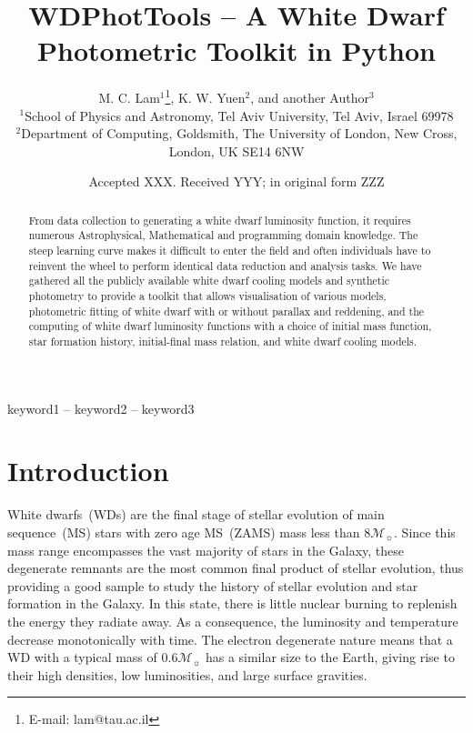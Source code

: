 \documentclass[fleqn,usenatbib]{rasti}
\title[WD Photometric Toolkit]{WDPhotTools -- A White Dwarf Photometric Toolkit in Python}
\author[M. C. Lam et al.]{
M. C. Lam$^{1}$\thanks{E-mail: lam@tau.ac.il},
K. W. Yuen$^{2}$,
and another Author$^{3}$
\\
$^{1}$School of Physics and Astronomy, Tel Aviv University, Tel Aviv, Israel 69978\\
$^{2}$Department of Computing, Goldsmith, The University of London, New Cross, London, UK SE14 6NW
}
\date{Accepted XXX. Received YYY; in original form ZZZ}
\newcommand{\msun}{\mathcal{M}_{\sun}}
\begin{document}
\label{firstpage}
\pagerange{\pageref{firstpage}--\pageref{lastpage}}
\maketitle

\begin{abstract}
From data collection to generating a white dwarf luminosity function, it
requires numerous Astrophysical, Mathematical and programming domain
knowledge. The steep learning curve makes it difficult to enter the field and
often individuals have to reinvent the wheel to perform identical data reduction
and analysis tasks. We have gathered all the publicly available white dwarf
cooling models and synthetic photometry to provide a toolkit that allows
visualisation of various models, photometric fitting of white dwarf with or
without parallax and reddening, and the computing of white dwarf luminosity
functions with a choice of initial mass function, star formation history,
initial-final mass relation, and white dwarf cooling models.

\end{abstract}

\begin{keywords}
keyword1 -- keyword2 -- keyword3
\end{keywords}


\section{Introduction}
White dwarfs~(WDs) are the final stage of stellar evolution of main
sequence~(MS) stars with zero age MS~(ZAMS) mass less than $8\msun$. Since this
mass range encompasses the vast majority of stars in the Galaxy, these
degenerate remnants are the most common final product of stellar evolution,
thus providing a good sample to study the history of stellar evolution and star
formation in the Galaxy. In this state, there is little nuclear burning to
replenish the energy they radiate away. As a consequence, the luminosity and
temperature decrease monotonically with time. The electron degenerate nature
means that a WD with a typical mass of $0.6\mathcal{M}_{\sun}$ has a similar
size to the Earth, giving rise to their high densities, low luminosities, and
large surface gravities.
\end{document}
